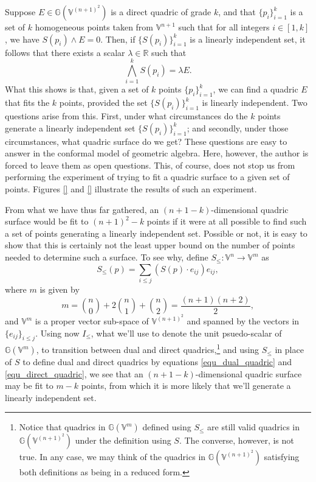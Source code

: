 \documentclass{birkjour}
\theoremstyle{definition}
\theoremstyle{remark}
\numberwithin{equation}{section}
\newcommand{\G}{\mathbb{G}}
\newcommand{\V}{\mathbb{V}}
\newcommand{\R}{\mathbb{R}}
\begin{document}
Suppose $E\in\G(\V^{(n+1)^2})$ is a direct quadric of grade $k$, and
that $\{p_i\}_{i=1}^k$ is a set of $k$ homogeneous points taken from $\V^{n+1}$
such that for all integers $i\in[1,k]$, we have $S(p_i)\wedge E=0$.  Then,
if $\{S(p_i)\}_{i=1}^k$ is a linearly independent set, it follows that
there exists a scalar $\lambda\in\R$ such that
\begin{equation}
\bigwedge_{i=1}^k S(p_i) = \lambda E.
\end{equation}
What this shows is that, given a set of $k$ points $\{p_i\}_{i=1}^k$, we can find a quadric $E$
that fits the $k$ points, provided the set $\{S(p_i)\}_{i=1}^k$ is linearly
independent.  Two questions
arise from this.  First, under what circumstances do the $k$ points generate
a linearly independent set $\{S(p_i)\}_{i=1}^k$; and secondly, under
those circumstances, what quadric surface do we get?  These questions
are easy to answer in the conformal model of geometric algebra.  Here, however,
the author is forced to leave them as open questions.  This, of course, does
not stop us from performing the experiment of trying to fit a quadric surface
to a given set of points.  Figures \ref{} and \ref{} illustrate the results
of such an experiment.

From what we have thus far gathered, an $(n+1-k)$-dimensional quadric surface
would be fit to $(n+1)^2-k$ points if it were at all possible to find such a set
of points generating a linearly independent set.  Possible or not, it is easy to show that this
is certainly not the least upper bound on the number of points needed to determine
such a surface.  To see why, define $S_{\leq}:\V^n\to\V^m$ as
\begin{equation}
S_{\leq}(p) = \sum_{i\leq j}(S(p)\cdot e_{ij})e_{ij},
\end{equation}
where $m$ is given by
\begin{equation}
m = \binom{n}{0}+2\binom{n}{1}+\binom{n}{2} = \frac{(n+1)(n+2)}{2},
\end{equation}
and $\V^m$ is a proper vector sub-space of $\V^{(n+1)^2}$ and spanned
by the vectors in $\{e_{ij}\}_{i\leq j}$.
Using now $I_{\leq}$, what we'll use to denote the unit psuedo-scalar of $\G(\V^m)$,
to transition between dual and direct quadrics,\footnote{Notice that quadrics in $\G(\V^m)$
defined using $S_{\leq}$ are still valid quadrics in $\G(\V^{(n+1)^2})$ under the definition
using $S$.  The converse, however, is not true.  In any case, we may think of the
quadrics in $\G(\V^{(n+1)^2})$ satisfying both definitions as being in a reduced form.}
and using $S_{\leq}$ in place of $S$
to define dual and direct quadrics by equations \eqref{equ_dual_quadric} and
\eqref{equ_direct_quadric}, we see that
an $(n+1-k)$-dimensional quadric surface may be fit to $m-k$ points, from which it
is more likely that we'll generate a linearly independent set.
\end{document}
